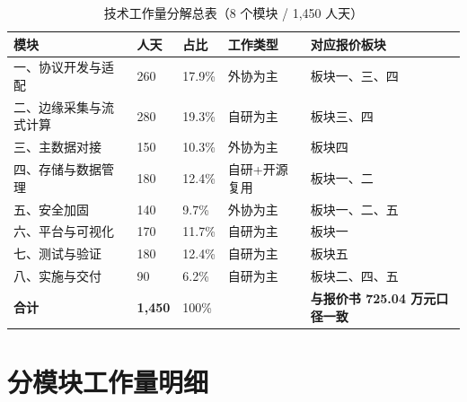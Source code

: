 \documentclass[11pt,a4paper]{ctexart}
\begin{document}
\begin{table}[H]\centering
\caption{技术工作量分解总表（8 个模块 / 1,450 人天）}
\begin{tabular}{p{4.4cm} p{1.8cm} p{1.6cm} p{2.2cm} p{3.2cm}}
\toprule
\textbf{模块} & \textbf{人天} & \textbf{占比} & \textbf{工作类型} & \textbf{对应报价板块} \\
\midrule
一、协议开发与适配 & 260 & 17.9\% & 外协为主 & 板块一、三、四 \\
二、边缘采集与流式计算 & 280 & 19.3\% & 自研为主 & 板块三、四 \\
三、主数据对接 & 150 & 10.3\% & 外协为主 & 板块四 \\
四、存储与数据管理 & 180 & 12.4\% & 自研+开源复用 & 板块一、二 \\
五、安全加固 & 140 & 9.7\% & 外协为主 & 板块一、二、五 \\
六、平台与可视化 & 170 & 11.7\% & 自研为主 & 板块一 \\
七、测试与验证 & 180 & 12.4\% & 自研为主 & 板块五 \\
八、实施与交付 & 90 & 6.2\% & 自研为主 & 板块二、四、五 \\
\midrule
\textbf{合计} & \textbf{1,450} & 100\% & & \textbf{与报价书 725.04 万元口径一致} \\
\bottomrule
\end{tabular}
\end{table}

\section{分模块工作量明细}
\end{document}
